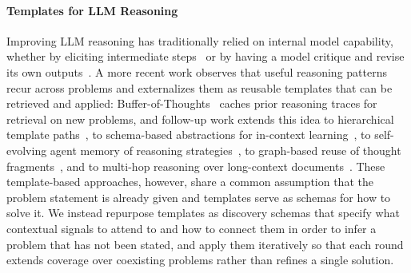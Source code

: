 \paragraph{Templates for LLM Reasoning}
Improving LLM reasoning has traditionally relied on internal model capability, whether by eliciting intermediate steps~\cite{cot, zeroshotcot} or by having a model critique and revise its own outputs~\cite{self-refine, reflexion}. A more recent work observes that useful reasoning patterns recur across problems and externalizes them as reusable templates that can be retrieved and applied: Buffer-of-Thoughts~\cite{BoT} caches prior reasoning traces for retrieval on new problems, and follow-up work extends this idea to hierarchical template paths~\cite{ReasonFlux, SuperCorrect}, to schema-based abstractions for in-context learning~\cite{SA-ICL}, to self-evolving agent memory of reasoning strategies~\cite{ReasoningBank}, to graph-based reuse of thought fragments~\cite{RoT}, and to multi-hop reasoning over long-context documents~\cite{ToTAL}. These template-based approaches, however, share a common assumption that the problem statement is already given and templates serve as schemas for how to solve it. We instead repurpose templates as discovery schemas that specify what contextual signals to attend to and how to connect them in order to infer a problem that has not been stated, and apply them iteratively so that each round extends coverage over coexisting problems rather than refines a single solution.
